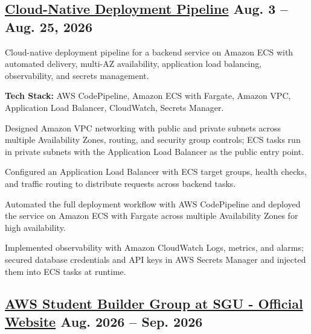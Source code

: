 
\subsection{{\large\href{https://github.com/alixblu/devops-lab.git}{Cloud-Native Deployment Pipeline}\normalsize\mdseries{} \texorpdfstring{\hfill}{} Aug. 3 -- Aug. 25, 2026}}

\vspace{0.7em}
\noindent Cloud-native deployment pipeline for a backend service on Amazon ECS with automated delivery, multi-AZ availability, application load balancing, observability, and secrets management.\par
\noindent \textbf{Tech Stack:} AWS CodePipeline, Amazon ECS with Fargate, Amazon VPC, Application Load Balancer, CloudWatch, Secrets Manager.\par
\vspace{-0.7em}
\begin{zitemize}

    \item Designed Amazon VPC networking with public and private subnets across multiple Availability Zones, routing, and security group controls; ECS tasks run in private subnets with the Application Load Balancer as the public entry point.

    \item Configured an Application Load Balancer with ECS target groups, health checks, and traffic routing to distribute requests across backend tasks.

    \item Automated the full deployment workflow with AWS CodePipeline and deployed the service on Amazon ECS with Fargate across multiple Availability Zones for high availability.

    \item Implemented observability with Amazon CloudWatch Logs, metrics, and alarms; secured database credentials and API keys in AWS Secrets Manager and injected them into ECS tasks at runtime.
\end{zitemize}


\subsection{{\large\href{https://github.com/asbg-sgu}{AWS Student Builder Group at SGU - Official Website}\normalsize\mdseries{} \texorpdfstring{\hfill}{} Aug. 2026 -- Sep. 2026}}
\vspace{0.7em}

